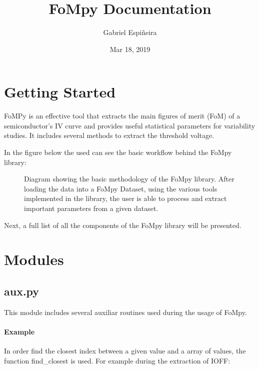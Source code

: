 \documentclass[letterpaper,10pt,english,openany, oneside]{sphinxmanual}
\title{FoMpy Documentation}
\date{Mar 18, 2019}
\author{Gabriel Espiñeira}
\let\sphinxpxdimen\pdfpxdimen\else\newdimen\sphinxpxdimen
\begin{document}
\pagestyle{empty}
\maketitle
\pagestyle{plain}
\sphinxtableofcontents
\pagestyle{normal}
\label{\detokenize{index::doc}}



\chapter{Getting Started}
\label{\detokenize{index:getting-started}}
FoMPy is an effective tool that extracts the main figures of merit (FoM) of a semiconductor’s IV curve and provides useful statistical parameters for variability studies. It includes several methods to extract the threshold voltage.

In the figure below the used can see the basic workflow behind the FoMpy library:

\begin{figure}[htbp]
\centering
\capstart

\noindent\sphinxincludegraphics[width=600\sphinxpxdimen,height=400\sphinxpxdimen]{{simplified_diagram}.jpg}
\caption{Diagram showing the basic methodology of the FoMpy library. After loading the data into a FoMpy Dataset, using the various tools implemented in the library, the user is able to process and extract important parameters from a given dataset.}\label{\detokenize{index:id1}}\end{figure}

Next, a full list of all the components of the FoMpy library will be presented.


\chapter{Modules}
\label{\detokenize{index:module-fompy.aux}}\label{\detokenize{index:modules}}

\section{aux.py}
\label{\detokenize{index:aux-py}}
This module includes several auxiliar routines used during the usage of FoMpy.
\subsubsection*{Example}

In order find the closest index between a given value and a array of values, the function
find\_closest is used. For example during the extraction of IOFF:
\end{document}

